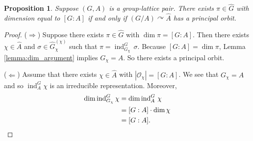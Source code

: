\documentclass[10pt,a4paper]{amsart}
\newtheorem{prop}{Proposition}
\newcommand{\mc}{\mathcal}
\newcommand{\te}[1]{\operatorname{#1}}
\newcommand{\wh}{\widehat}
\begin{document}
\begin{prop}\label{prop:equivalence_faithful_action}
Suppose $(G,A)$ is a group-lattice pair. There exists $\pi\in\wh{G}$ with dimension equal to $[G:A]$ if and only if $(G\slash A)\curvearrowright \widehat{A}$ has a principal orbit.
\end{prop}

\begin{proof}

($\Rightarrow$) Suppose there exists $\pi\in\wh{G}$ with $\dim \pi=[G:A]$. Then there exists $\chi\in\wh{A}$ and $\sigma\in\wh{G}_{\chi}^{(\chi)}$ such that $\pi=\te{ind}_{G_{\chi}}^G\,\sigma$. Because $[G:A]=\dim \pi$, Lemma \ref{lemma:dim_argument} implies  $G_{\chi}=A$. So there exists a principal orbit.

($\Leftarrow$) Assume that there exists $\chi\in\wh{A}$ with $|\mc{O}_{\chi}|=[G:A]$. We see that $G_{\chi}=A$ and so $\te{ind}_A^G \chi$ is an irreducible representation. Moreover, 
\begin{align*}
\dim\te{ind}_{G_{\chi}}^G\chi&=\dim\te{ind}_A^G\,\chi\\
&=[G:A]\cdot\dim\chi\\
&=[G:A].\qedhere
\end{align*}
\end{proof}
\end{document}
